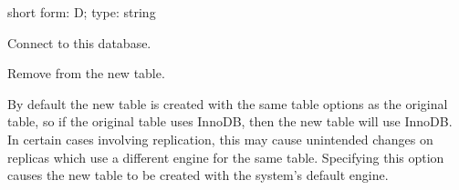 \documentclass[letterpaper,10pt,english]{sphinxmanual}
\begin{document}
\begin{fulllineitems}
\label{\detokenize{mariadb-schema-change:cmdoption-mariadb-schema-change-database}}
\sphinxAtStartPar
short form: \sphinxhyphen{}D; type: string

\sphinxAtStartPar
Connect to this database.

\end{fulllineitems}


\begin{fulllineitems}
\label{\detokenize{mariadb-schema-change:cmdoption-mariadb-schema-change-default-engine}}
\sphinxAtStartPar
Remove  from the new table.

\sphinxAtStartPar
By default the new table is created with the same table options as
the original table, so if the original table uses InnoDB, then the new
table will use InnoDB.  In certain cases involving replication, this may
cause unintended changes on replicas which use a different engine for
the same table.  Specifying this option causes the new table to be
created with the system’s default engine.

\end{fulllineitems}

\end{document}
